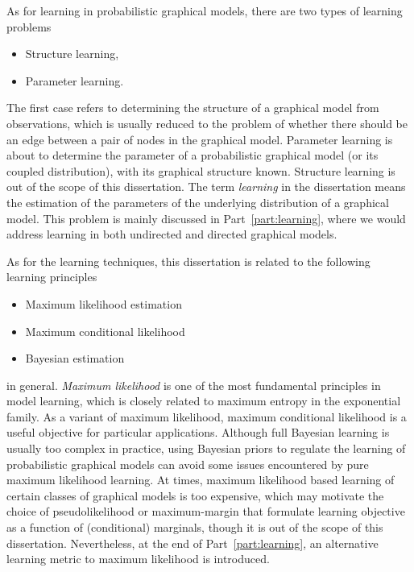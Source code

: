 As for learning in probabilistic graphical models, there are two types of learning problems
\begin{itemize}
\item Structure learning,
\item Parameter learning.
\end{itemize}
The first case refers to determining the structure of a graphical model from observations, which is usually reduced to the problem of whether there should be an edge between a pair of nodes in the graphical model. Parameter learning is about to determine the parameter of a probabilistic graphical model (or its coupled distribution), with its graphical structure known. Structure learning is out of the scope of this dissertation. The term \textit{learning} in the dissertation means the estimation of the parameters of the underlying distribution of a graphical model. This problem is mainly discussed in Part~\ref{part:learning}, where we would address learning in both undirected and directed graphical models. 


As for the learning techniques, this dissertation is related to the following learning principles
\begin{itemize}
\item Maximum likelihood estimation
\item Maximum conditional likelihood
\item Bayesian estimation
\end{itemize}
in general. \textit{Maximum likelihood} is one of the most fundamental principles in model learning, which is closely related to maximum entropy in the exponential family. As a variant of maximum likelihood, maximum conditional likelihood is a useful objective for particular applications. Although full Bayesian learning is usually too complex in practice, using Bayesian priors to regulate the learning of probabilistic graphical models can avoid some issues encountered by pure maximum likelihood learning.
At times, maximum likelihood based learning of certain classes of graphical models is too expensive, which may motivate the choice of pseudolikelihood or maximum-margin that formulate learning objective as a function of (conditional) marginals, though it is out of the scope of this dissertation. Nevertheless, at the end of Part~\ref{part:learning}, an alternative learning metric to maximum likelihood is introduced.

